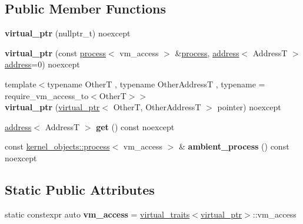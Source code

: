\subsection*{Public Member Functions}
\begin{DoxyCompactItemize}
\item 
\mbox{\label{classdistant_1_1memory_1_1virtual__ptr_a41a69dbe4c826121b9a2105543baf894}} 
{\bfseries virtual\+\_\+ptr} (nullptr\+\_\+t) noexcept
\item 
\mbox{\label{classdistant_1_1memory_1_1virtual__ptr_afab90fab354fb8126b466ba64d54059c}} 
{\bfseries virtual\+\_\+ptr} (const \mbox{\hyperlink{classdistant_1_1kernel__objects_1_1process}{process}}$<$ vm\+\_\+access $>$ \&\mbox{\hyperlink{classdistant_1_1kernel__objects_1_1process}{process}}, \mbox{\hyperlink{classdistant_1_1memory_1_1address}{address}}$<$ AddressT $>$ \mbox{\hyperlink{classdistant_1_1memory_1_1address}{address}}=0) noexcept
\item 
\mbox{\label{classdistant_1_1memory_1_1virtual__ptr_a825c03034067ef4f7355f039d5f8dc5c}} 
{\footnotesize template$<$typename OtherT , typename Other\+AddressT , typename  = require\+\_\+vm\+\_\+access\+\_\+to$<$\+Other\+T$>$$>$ }\\{\bfseries virtual\+\_\+ptr} (\mbox{\hyperlink{classdistant_1_1memory_1_1virtual__ptr}{virtual\+\_\+ptr}}$<$ OtherT, Other\+AddressT $>$ pointer) noexcept
\item 
\mbox{\label{classdistant_1_1memory_1_1virtual__ptr_a531f1da61b77dbcb8ede230567692d0b}} 
\mbox{\hyperlink{classdistant_1_1memory_1_1address}{address}}$<$ AddressT $>$ {\bfseries get} () const noexcept
\item 
\mbox{\label{classdistant_1_1memory_1_1virtual__ptr_a9d3a380ad6f5068014769d55a414bc15}} 
const \mbox{\hyperlink{classdistant_1_1kernel__objects_1_1process}{kernel\+\_\+objects\+::process}}$<$ vm\+\_\+access $>$ \& {\bfseries ambient\+\_\+process} () const noexcept
\end{DoxyCompactItemize}
\subsection*{Static Public Attributes}
\begin{DoxyCompactItemize}
\item 
\mbox{\label{classdistant_1_1memory_1_1virtual__ptr_a1dacaef418accf1e994d51d25f734f65}} 
static constexpr auto {\bfseries vm\+\_\+access} = \mbox{\hyperlink{structdistant_1_1memory_1_1virtual__traits}{virtual\+\_\+traits}}$<$\mbox{\hyperlink{classdistant_1_1memory_1_1virtual__ptr}{virtual\+\_\+ptr}}$>$\+::vm\+\_\+access
\end{DoxyCompactItemize}
